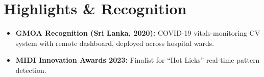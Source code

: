 \documentclass[11pt]{article}
\begin{document}
\section*{Highlights \& Recognition}
\begin{itemize}[leftmargin=1.2em, itemsep=-0.25em]
    \item \textbf{GMOA Recognition (Sri Lanka, 2020):} COVID-19 vitals-monitoring CV system with remote dashboard, deployed across hospital wards.
    \item \textbf{MIDI Innovation Awards 2023:} Finalist for ``Hot Licks'' real-time pattern detection.
\end{itemize}
\end{document}

